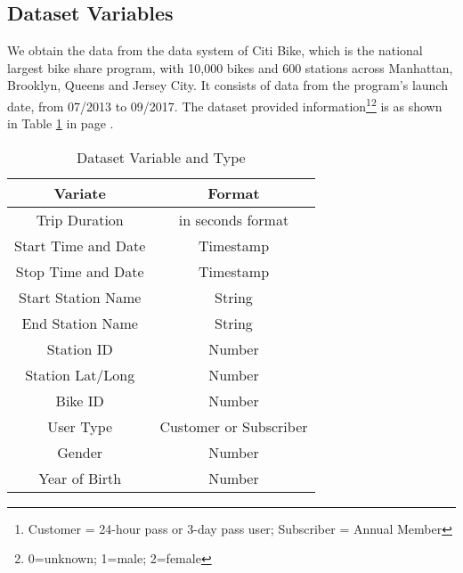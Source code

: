 \subsection{Dataset Variables}
  \par We obtain the data from the data system of Citi Bike, which is the national largest bike share program, with 10,000 bikes and 600 stations across Manhattan, Brooklyn, Queens and Jersey City\cite{bike}. It consists of data from the program's launch date, from 07/2013 to 09/2017. The dataset provided information\footnote{Customer = 24-hour pass or 3-day pass user; Subscriber = Annual Member}\footnote{0=unknown; 1=male; 2=female} is as shown in Table \ref{tab_1} in page \pageref{tab_1}. 
	\begin{center}
	\begin{table}[h!]
	\caption{Dataset Variable and Type}
	\label{tab_1}
	\begin{tabular}{ |c|c| } 
	 \hline
	 Variate & Format \\ 
	 \hline
	 Trip Duration & in seconds format \\ 
	 \hline
	 Start Time and Date & Timestamp\\ 
	 \hline
	 Stop Time and Date & Timestamp\\
	 \hline
	 Start Station Name & String\\
	 \hline
	 End Station Name & String\\
	 \hline
	 Station ID & Number\\
	 \hline
	 Station Lat/Long & Number\\
	 \hline
	 Bike ID & Number\\
	 \hline
	 User Type & Customer or Subscriber  \\
	 \hline
	 Gender & Number  \\
	 \hline
	 Year of Birth & Number\\
	 \hline
	\end{tabular}
	\end{table}
	\end{center}	
